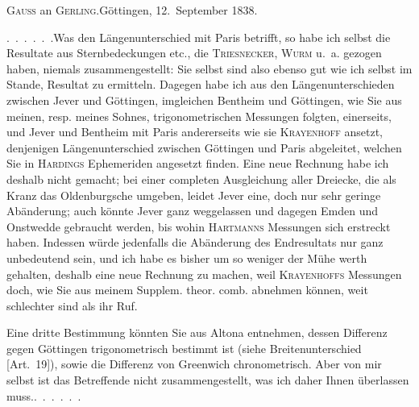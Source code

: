 \begin{center}
\textsc{Gauss} an \textsc{Gerling}.\quad Göttingen, 12.~September 1838.
\end{center}
\par\noindent\hspace*{\parindent}\mbox{.\ .\ .\ .\ .\ .}\quad Was den Längenunterschied mit Paris betrifft, so habe ich selbst die Resultate aus Sternbedeckungen etc., die \textsc{Triesnecker}, \textsc{Wurm} u.~a. gezogen haben, niemals zusammengestellt: Sie selbst sind also ebenso gut wie ich selbst im Stande,  Resultat zu ermitteln. Dagegen habe ich aus den Längenunterschieden zwischen Jever und Göttingen, imgleichen Bentheim und Göttingen, wie Sie aus meinen, resp. meines Sohnes, trigonometrischen Messungen folgten, einerseits, und Jever und Bentheim mit Paris andererseits wie sie \textsc{Krayenhoff} ansetzt, denjenigen Längenunterschied zwischen Göttingen und Paris abgeleitet, welchen Sie in \textsc{Hardings} Ephemeriden angesetzt finden. Eine neue Rechnung habe ich deshalb nicht gemacht; bei einer completen Ausgleichung aller Dreiecke, die als Kranz das Oldenburgsche umgeben, leidet Jever eine, doch nur sehr geringe Abänderung; auch könnte Jever ganz weggelassen und dagegen Emden und Onstwedde gebraucht werden, bis wohin \textsc{Hartmanns} Messungen sich erstreckt haben. Indessen würde jedenfalls die Abänderung des Endresultats nur ganz unbedeutend sein, und ich habe es bisher um so weniger der Mühe werth gehalten, deshalb eine neue Rechnung zu machen, weil \textsc{Krayenhoffs} Messungen doch, wie Sie aus meinem Supplem. theor. comb. abnehmen können, weit schlechter sind als ihr Ruf.
\par\noindent\hspace*{\parindent}Eine dritte Bestimmung könnten Sie aus Altona entnehmen, dessen Differenz gegen Göttingen trigonometrisch bestimmt ist (siehe Breitenunterschied [Art.~19]), sowie die Differenz von Greenwich chronometrisch. Aber von mir selbst ist das Betreffende nicht zusammengestellt, was ich daher Ihnen überlassen muss.\quad\mbox{.\ .\ .\ .\ .\ .}

